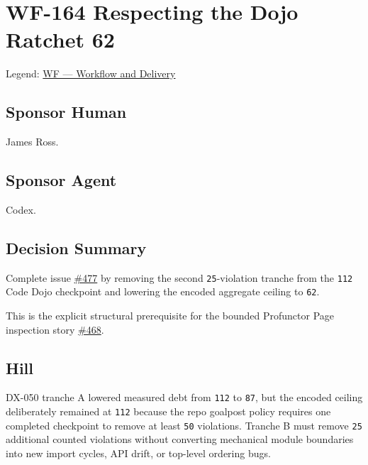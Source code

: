 \chapter{WF-164 Respecting the Dojo Ratchet 62}\label{record-246}

\smallskip

Legend: \href{https://github.com/flyingrobots/bijou/blob/1853ad902f6bf219326409e7f743a5a1d6517dbc/docs/legends/WF-workflow-and-delivery.md}{WF --- Workflow and Delivery}

\section{Sponsor Human}\label{record-246-sponsor-human}

James Ross.

\section{Sponsor Agent}\label{record-246-sponsor-agent}

Codex.

\section{Decision Summary}\label{record-246-decision-summary}

Complete issue \href{https://github.com/flyingrobots/bijou/issues/477}{\#477} by removing the second \texttt{2\allowbreak{}5}-violation tranche from the \texttt{1\allowbreak{}1\allowbreak{}2} Code Dojo checkpoint and lowering the encoded aggregate ceiling to \texttt{6\allowbreak{}2}.

This is the explicit structural prerequisite for the bounded Profunctor Page inspection story \href{https://github.com/flyingrobots/bijou/issues/468}{\#468}.

\section{Hill}\label{record-246-hill}

DX-050 tranche A lowered measured debt from \texttt{1\allowbreak{}1\allowbreak{}2} to \texttt{8\allowbreak{}7}, but the encoded ceiling deliberately remained at \texttt{1\allowbreak{}1\allowbreak{}2} because the repo goalpost policy requires one completed checkpoint to remove at least \texttt{5\allowbreak{}0} violations. Tranche B must remove \texttt{2\allowbreak{}5} additional counted violations without converting mechanical module boundaries into new import cycles, API drift, or top-level ordering bugs.

